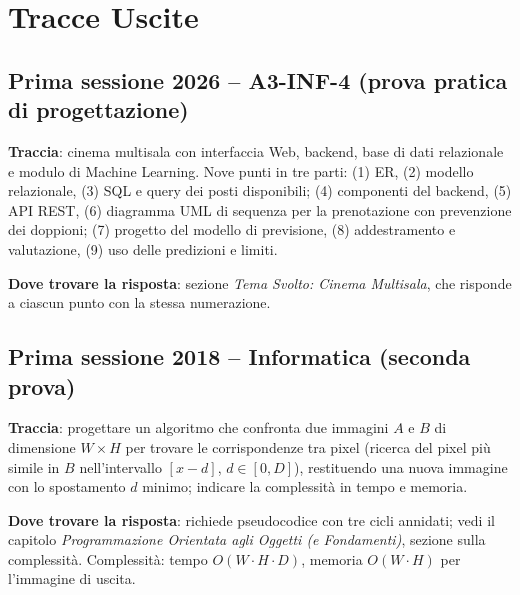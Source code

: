 
\section*{Tracce Uscite} %

\subsection*{Prima sessione 2026 -- A3-INF-4 (prova pratica di progettazione)}
\textbf{Traccia}: cinema multisala con interfaccia Web, backend, base di dati relazionale e modulo di Machine Learning. Nove punti in tre parti: (1) ER, (2) modello relazionale, (3) SQL e query dei posti disponibili; (4) componenti del backend, (5) API REST, (6) diagramma UML di sequenza per la prenotazione con prevenzione dei doppioni; (7) progetto del modello di previsione, (8) addestramento e valutazione, (9) uso delle predizioni e limiti.

\textbf{Dove trovare la risposta}: sezione \emph{Tema Svolto: Cinema Multisala}, che risponde a ciascun punto con la stessa numerazione.

\subsection*{Prima sessione 2018 -- Informatica (seconda prova)}
\textbf{Traccia}: progettare un algoritmo che confronta due immagini $A$ e $B$ di dimensione $W \times H$ per trovare le corrispondenze tra pixel (ricerca del pixel più simile in $B$ nell'intervallo $[x-d]$, $d \in [0,D]$), restituendo una nuova immagine con lo spostamento $d$ minimo; indicare la complessità in tempo e memoria.

\textbf{Dove trovare la risposta}: richiede pseudocodice con tre cicli annidati; vedi il capitolo \emph{Programmazione Orientata agli Oggetti (e Fondamenti)}, sezione sulla complessità. Complessità: tempo $O(W \cdot H \cdot D)$, memoria $O(W \cdot H)$ per l'immagine di uscita.
